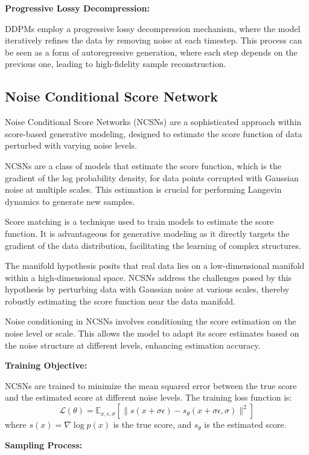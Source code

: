 \documentclass[sigconf,natbib=false]{acmart}
\begin{document}
\textbf{Progressive Lossy Decompression:}

DDPMs employ a progressive lossy decompression mechanism,
where the model iteratively refines the data by removing noise at each timestep.
This process can be seen as a form of autoregressive generation,
where each step depends on the previous one, leading to high-fidelity sample reconstruction.

\subsection{Noise Conditional Score Network}
Noise Conditional Score Networks (NCSNs) are a sophisticated approach
within score-based generative modeling,
designed to estimate the score function of data perturbed with varying noise levels.

NCSNs are a class of models that estimate the score function,
which is the gradient of the log probability density,
for data points corrupted with Gaussian noise at multiple scales.
This estimation is crucial for performing Langevin dynamics to generate new samples.

Score matching is a technique used to train models to estimate the score function.
It is advantageous for generative modeling as it directly targets the gradient
of the data distribution, facilitating the learning of complex structures.

The manifold hypothesis posits that real data lies on a low-dimensional manifold
within a high-dimensional space.
NCSNs address the challenges posed by this hypothesis by perturbing data
with Gaussian noise at various scales,
thereby robustly estimating the score function near the data manifold.

Noise conditioning in NCSNs involves conditioning the score estimation on the noise level or scale.
This allows the model to adapt its score estimates
based on the noise structure at different levels, enhancing estimation accuracy.

\textbf{Training Objective:}

NCSNs are trained to minimize the mean squared error between the true score
and the estimated score at different noise levels.
The training loss function is:
\[ \mathcal{L}(\theta) = \mathbb{E}_{x, \epsilon, \sigma} \left[ \| s(x + \sigma \epsilon) - s_\theta(x + \sigma \epsilon, \sigma) \|^2 \right] \]
where \( s(x) = \nabla \log p(x) \) is the true score,
and \( s_\theta \) is the estimated score.

\textbf{Sampling Process:}
\end{document}
